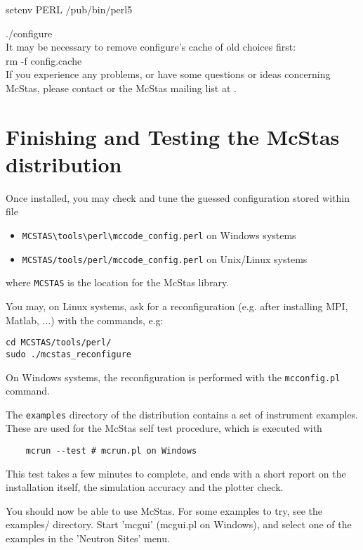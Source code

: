     setenv PERL /pub/bin/perl5

    ./configure\\

\noindent It may be necessary to remove configure's cache of old
choices first:\\


    rm -f config.cache\\


\noindent If you experience any problems, or have some questions or ideas
concerning McStas, please contact
or the McStas mailing list at .

\section{Finishing and Testing the McStas distribution}
\label{s:testing}

Once installed, you may check and tune the guessed configuration stored within file
\begin{itemize}
\item{\verb+MCSTAS\tools\perl\mccode_config.perl+ on Windows systems}
\item{\verb+MCSTAS/tools/perl/mccode_config.perl+ on Unix/Linux systems}
\end{itemize}
where \verb+MCSTAS+ is the location for the McStas library.

You may, on Linux systems, ask for a reconfiguration (e.g. after installing MPI, Matlab, ...) with the commands, e.g:
\begin{verbatim}
cd MCSTAS/tools/perl/
sudo ./mcstas_reconfigure
\end{verbatim}
On Windows systems, the reconfiguration is performed with the \verb+mcconfig.pl+ command.

The \verb+examples+ directory of the distribution contains a set of instrument examples. These are used for the McStas self test procedure, which is executed with
\begin{verbatim}
    mcrun --test # mcrun.pl on Windows
\end{verbatim}
This test takes a few minutes to complete, and ends with a short report on the installation itself, the simulation accuracy and the plotter check.

You should now be able to use McStas. For some examples to try, see the
examples/ directory. Start 'mcgui' (mcgui.pl on Windows), and select one of the examples in the 'Neutron Sites' menu.
